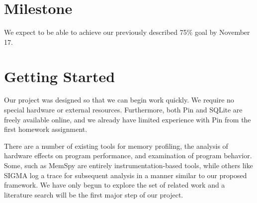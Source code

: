 \documentclass{article}
\begin{document}
\section{Milestone}
We expect to be able to achieve our previously described 75\%
goal by November 17.

\section{Getting Started}
Our project was designed so that we can begin work
quickly.  We require no special hardware or external resources.
Furthermore, both Pin and SQLite are freely available online,
and we already have limited experience with Pin from the
first homework assignment.

There are a number of existing tools for memory profiling,
the analysis of hardware effects on program performance, and
examination of program behavior.  Some, such as MemSpy \cite{memspy}
are entirely instrumentation-based tools, while others like SIGMA \cite{sigma}
log a trace for subsequent analysis in a manner similar to
our proposed framework.  We have
only begun to explore the set of related work and a literature
search will be the first major step of our project.



\end{document}
